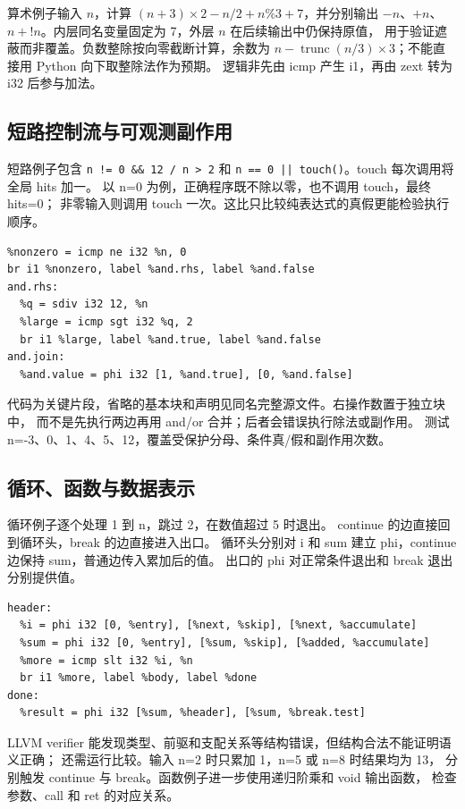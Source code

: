 \documentclass[UTF8,a4paper,11pt]{ctexart}
\begin{document}
算术例子输入 $n$，计算 $(n+3)\times2-n/2+n\%3+7$，并分别输出
$-n$、$+n$、$n+!n$。内层同名变量固定为 7，外层 $n$ 在后续输出中仍保持原值，
用于验证遮蔽而非覆盖。负数整除按向零截断计算，余数为
$n-\operatorname{trunc}(n/3)\times3$；不能直接用 Python 向下取整除法作为预期。
逻辑非先由 icmp 产生 i1，再由 zext 转为 i32 后参与加法。

\subsection{短路控制流与可观测副作用}
短路例子包含 \texttt{n != 0 \&\& 12 / n > 2} 和
\texttt{n == 0 || touch()}。touch 每次调用将全局 hits 加一。
以 n=0 为例，正确程序既不除以零，也不调用 touch，最终 hits=0；
非零输入则调用 touch 一次。这比只比较纯表达式的真假更能检验执行顺序。

\par\vspace{0.7\baselineskip}\noindent\begin{minipage}[t]{\linewidth}
\begin{lstlisting}
%nonzero = icmp ne i32 %n, 0
br i1 %nonzero, label %and.rhs, label %and.false
and.rhs:
  %q = sdiv i32 12, %n
  %large = icmp sgt i32 %q, 2
  br i1 %large, label %and.true, label %and.false
and.join:
  %and.value = phi i32 [1, %and.true], [0, %and.false]
\end{lstlisting}
\end{minipage}\par\vspace{0.5\baselineskip}
代码为关键片段，省略的基本块和声明见同名完整源文件。右操作数置于独立块中，
而不是先执行两边再用 and/or 合并；后者会错误执行除法或副作用。
测试 n=-3、0、1、4、5、12，覆盖受保护分母、条件真/假和副作用次数。

\subsection{循环、函数与数据表示}
循环例子逐个处理 1 到 n，跳过 2，在数值超过 5 时退出。
continue 的边直接回到循环头，break 的边直接进入出口。
循环头分别对 i 和 sum 建立 phi，continue 边保持 sum，普通边传入累加后的值。
出口的 phi 对正常条件退出和 break 退出分别提供值。

\par\vspace{0.7\baselineskip}\noindent\begin{minipage}[t]{\linewidth}
\begin{lstlisting}
header:
  %i = phi i32 [0, %entry], [%next, %skip], [%next, %accumulate]
  %sum = phi i32 [0, %entry], [%sum, %skip], [%added, %accumulate]
  %more = icmp slt i32 %i, %n
  br i1 %more, label %body, label %done
done:
  %result = phi i32 [%sum, %header], [%sum, %break.test]
\end{lstlisting}
\end{minipage}\par\vspace{0.5\baselineskip}
LLVM verifier 能发现类型、前驱和支配关系等结构错误，但结构合法不能证明语义正确；
还需运行比较。输入 n=2 时只累加 1，n=5 或 n=8 时结果均为 13，
分别触发 continue 与 break。函数例子进一步使用递归阶乘和 void 输出函数，
检查参数、call 和 ret 的对应关系。
\end{document}
